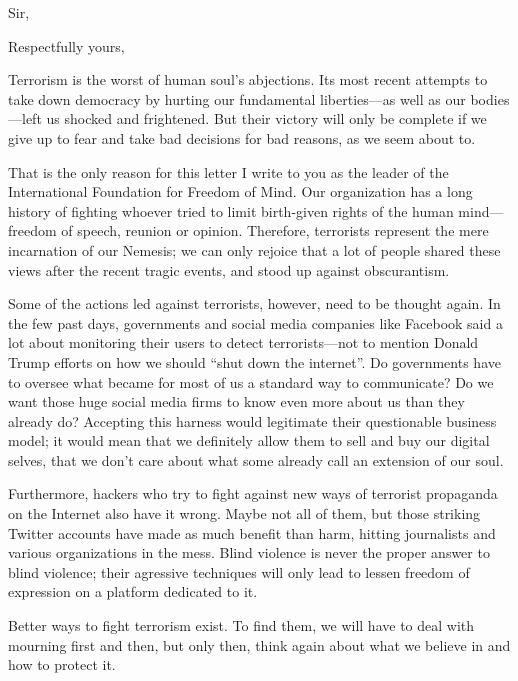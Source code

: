 \documentclass[12pt,a4paper]{moderncv}        %
\begin{document}
\date{Rennes, January 21\textsuperscript{st}, 2016}
\opening{Sir,}
\closing{Respectfully yours,}
\makelettertitle

Terrorism is the worst of human soul's abjections. Its most recent attempts to take down democracy by hurting our fundamental liberties---as well as our bodies---left us shocked and frightened. But their victory will only be complete if we give up to fear and take bad decisions for bad reasons, as we seem about to.

That is the only reason for this letter I write to you as the leader of the International Foundation for Freedom of Mind. Our organization has a long history of fighting whoever tried to limit birth-given rights of the human mind---freedom of speech, reunion or opinion. Therefore, terrorists represent the mere incarnation of our Nemesis; we can only rejoice that a lot of people shared these views after the recent tragic events, and stood up against obscurantism.

Some of the actions led against terrorists, however, need to be thought again. In the few past days, governments and social media companies like Facebook said a lot about monitoring their users to detect terrorists---not to mention Donald Trump efforts on how we should ``shut down the internet''. Do governments have to oversee what became for most of us a standard way to communicate? Do we want those huge social media firms to know even more about us than they already do? Accepting this harness would legitimate their questionable business model; it would mean that we definitely allow them to sell and buy our digital selves, that we don't care about what some already call an extension of our soul.

Furthermore, hackers who try to fight against new ways of terrorist propaganda on the Internet also have it wrong. Maybe not all of them, but those striking Twitter accounts have made as much benefit than harm, hitting journalists and various organizations in the mess. Blind violence is never the proper answer to blind violence; their agressive techniques will only lead to lessen freedom of expression on a platform dedicated to it.

Better ways to fight terrorism exist. To find them, we will have to deal with mourning first and then, but only then, think again about what we believe in and how to protect it.

\makeletterclosing

\end{document}
